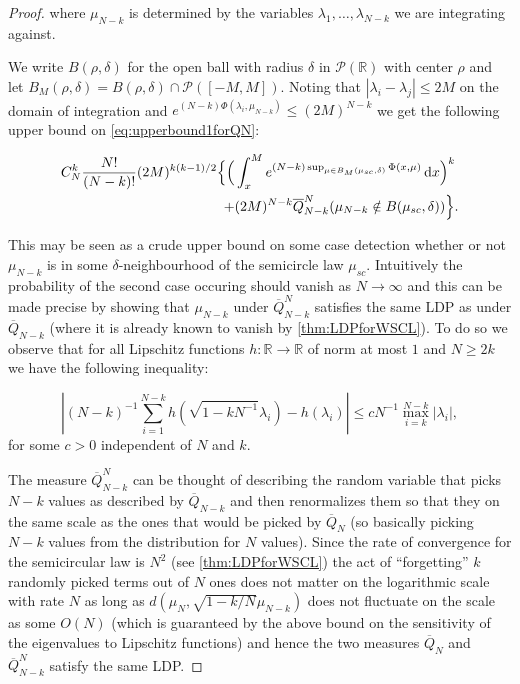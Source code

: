 \begin{proof}
	where $\mu_{N-k}$ is determined by the variables $\lambda_1,\dots,\lambda_{N-k}$ we are integrating against.
	
	We write $B(\rho,\delta)$ for the open ball with radius $\delta$ in $\mathcal P(\mathbb R)$ with center $\rho$ and let $B_M(\rho,\delta)=B(\rho,\delta)\cap\mathcal P([-M,M])$. Noting that $|\lambda_i-\lambda_j|\leq 2M$ on the domain of integration and $e^{(N-k)\Phi(\lambda_i,\mu_{N-k})}\leq (2M)^{N-k}$ we get the following upper bound on \ref{eq:upperbound1forQN}:
	
	\begin{align}\label{eq:upperbound2forQN}
		C_N^k\frac{N!}{(N-k)!}(2M)^{k(k-1)/2}\Big\{
			\Big(
				&\int_x^M e^{(N-k)\sup_{\mu\in B_M(\mu_{sc},\delta)}\Phi(x,\mu)}\mathop{}\!\mathrm{d} x
			\Big)^k \nonumber\\
			+&(2M)^{N-k}\overline Q_{N-k}^N(\mu_{N-k}\notin B(\mu_{sc},\delta))
		\Big\}.
	\end{align}
	
	This may be seen as a crude upper bound on some case detection whether or not $\mu_{N-k}$ is in some $\delta$-neighbourhood of the semicircle law $\mu_{sc}$. Intuitively the probability of the second case occuring should vanish as $N\rightarrow\infty$ and this can be made precise by showing that $\mu_{N-k}$ under $\overline Q_{N-k}^N$ satisfies the same LDP as under $\overline Q_{N-k}$ (where it is already known to vanish by \ref{thm:LDPforWSCL}). To do so we observe that for all Lipschitz functions $h:\mathbb R \rightarrow\mathbb R$ of norm at most $1$ and $N\geq 2k$ we have the following inequality:
	
	$$
	\left|(N-k)^{-1}\sum_{i=1}^{N-k}h\left(\sqrt{1-kN^{-1}}\lambda_i\right)-h(\lambda_i)\right|\leq cN^{-1}\max_{i=k}^{N-k}|\lambda_i|,
	$$
	for some $c>0$ independent of $N$ and $k$. 
	
	The measure $\overline Q_{N-k}^N$ can be thought of describing the random variable that picks $N-k$ values as described by $\overline Q_{N-k}$ and then renormalizes them so that they on the same scale as the ones that would be picked by $\overline Q_N$ (so basically picking $N-k$ values from the distribution for $N$ values). Since the rate of convergence for the semicircular law is $N^2$ (see \ref{thm:LDPforWSCL}) the act of ``forgetting'' $k$ randomly picked terms out of $N$ ones does not matter on the logarithmic scale with rate $N$ as long as $d(\mu_N, \sqrt{1-k/N}\mu_{N-k})$ does not fluctuate on the scale as some $O(N)$ (which is guaranteed by the above bound on the sensitivity of the eigenvalues to Lipschitz functions) and hence the two measures $\overline Q_N$ and $\overline Q_{N-k}^N$ satisfy the same LDP.
	

\end{proof}
